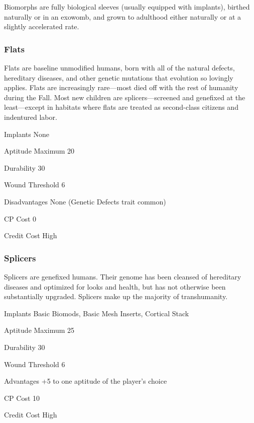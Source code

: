 Biomorphs are fully biological sleeves (usually equipped with implants), birthed naturally or in an exowomb, and grown to adulthood either naturally or at a slightly accelerated rate.

\subsubsection{Flats}
\label{sec:starting-flats}

Flats are baseline unmodified humans, born with all of the natural defects, hereditary diseases, and other genetic mutations that evolution so lovingly applies. Flats are increasingly rare—most died off with the rest of humanity during the Fall. Most new children are splicers—screened and genefixed at the least—except in habitats where flats are treated as second-class citizens and indentured labor.

\begin{description*}
\item[Implants] None
\item[Aptitude Maximum] 20
\item[Durability] 30
\item[Wound Threshold] 6
\item[Disadvantages] None (Genetic Defects trait common)
\item[CP Cost] 0
\item[Credit Cost] High
\end{description*}

\subsubsection{Splicers}
\label{sec:starting-splicers}

Splicers are genefixed humans. Their genome has been cleansed of hereditary diseases and optimized for looks and health, but has not otherwise been substantially upgraded. Splicers make up the majority of transhumanity.

\begin{description*}
\item[Implants] Basic Biomods, Basic Mesh Inserts, Cortical Stack
\item[Aptitude Maximum] 25
\item[Durability] 30
\item[Wound Threshold] 6
\item[Advantages] +5 to one aptitude of the player’s choice
\item[CP Cost] 10
\item[Credit Cost] High
\end{description*}


